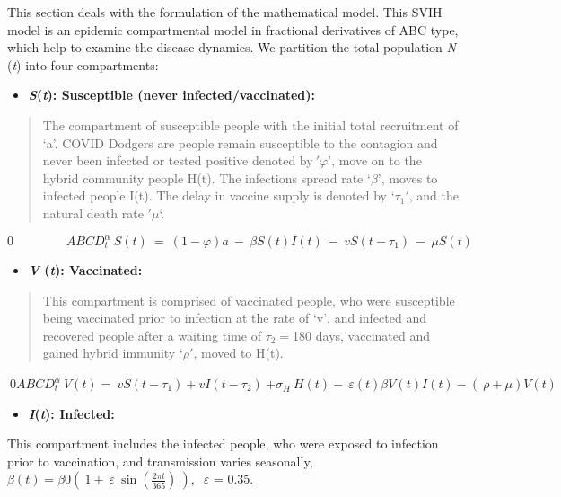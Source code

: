 \documentclass[10pt]{NSP1}
\begin{document}
This section deals with the formulation of the mathematical model. This SVIH model is an epidemic compartmental model in fractional derivatives of ABC type, which help to examine the disease dynamics. We partition the total population \emph{N} (\emph{t}) into four compartments:

\begin{itemize}
\item
  \textbf{\emph{S}(\emph{t}): Susceptible (never infected/vaccinated):}
\end{itemize}

\begin{quote}
The compartment of susceptible people with the initial total recruitment of `a'. COVID Dodgers are people remain susceptible to the contagion and never been infected or tested positive denoted by\(\ '\varphi\)', move on to the hybrid community people H(t). The infections spread rate `\(\beta\)', moves to infected people I(t). The delay in vaccine supply is denoted by `\(\tau_{1}'\), and the natural death rate \('\mu\)`.
\end{quote}

\[0\ \ \ \ \ \ \ \ \ \ \ \ \ \ \ \ \ \ \ ABCD_{t}^{\alpha}\ S(t)\  = \ (1 - \varphi)a\  - \ \beta S(t)I(t)\  - \ vS(t - \tau_{1})\  - \ \mu S(t)\]

\begin{itemize}
\item
  \textbf{\emph{V} (\emph{t}): Vaccinated:}
\end{itemize}

\begin{quote}
This compartment is comprised of vaccinated people, who were susceptible being vaccinated prior to infection at the rate of `v', and infected and recovered people after a waiting time of \(\tau_{2} =\)180 days, vaccinated and gained hybrid immunity `\(\rho'\), moved to H(t).
\end{quote}

\(\ 0ABCD_{t}^{\alpha}\ V(t) = \ vS\left( t - \tau_{1} \right) + vI\left( t - \tau_{2} \right)\ {+ \sigma}_{H}\ H(t) - \ \varepsilon(t)\beta V(t)I(t) - (\ \rho + \mu)V(t)\)

\begin{itemize}
\item
  \textbf{\emph{I}(\emph{t}): Infected:}
\end{itemize}

This compartment includes the infected people, who were exposed to infection prior to vaccination, and transmission varies seasonally, \(\beta(t) = \beta 0\left( \ 1 + \ \varepsilon\ \sin\left( \frac{2\pi t}{365} \right)\  \right),\ \) $\varepsilon$ = 0.35.
\end{document}
